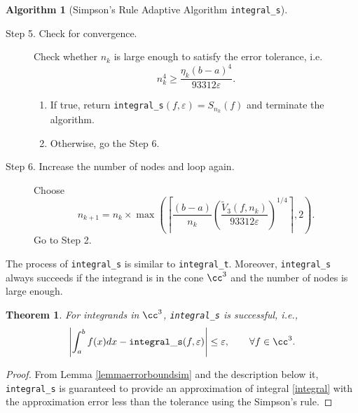 \documentclass{iitthesis}
\newtheorem{theorem}{Theorem}
\theoremstyle{definition}
\newtheorem{algo}{Algorithm}
\theoremstyle{remark}
\begin{document}
\begin{algo} [Simpson's Rule Adaptive Algorithm {\tt integral\_s}]
\begin{description}
\item[Step 5. Check for convergence.] Check whether $n_k$ is large enough to satisfy the error tolerance, i.e.
    \begin{equation*}
          n_k^4 \ge \frac{\eta_{k}(b-a)^4}{93312\varepsilon}.
    \end{equation*}

    \begin{enumerate}[label=\alph*)]
      \item If true, return {\tt integral\_s}$(f,\varepsilon)=S_{n_k}(f)$ and terminate the algorithm.
      \item Otherwise, go the Step 6.
    \end{enumerate}


\item[Step 6. Increase the number of nodes and loop again.] Choose
$$
n_{k+1}=n_k\times\max\left(\left\lceil\frac{(b-a)}{n_{k}}\left(\frac{\widetilde{V}_3(f,n_k)}{93312\varepsilon}\right)^{1/4}\right\rceil,2\right).
$$
Go to Step 2.
\end{description}
\end{algo}

The process of {\tt integral\_s} is similar to {\tt integral\_t}. Moreover, {\tt integral\_s} always succeeds if the integrand is in the cone $\cc^3$ and the number of nodes is large enough.
\begin{theorem}\label{thmSimpson}
    For integrands in $\cc^3$, {\tt integral\_s} is successful, i.e.,
    \begin{equation*}
      \left|\int_{a}^{b}f(x)dx-{\tt integral\_s}(f,\varepsilon)\right|\le\varepsilon, \qquad \forall f\in \cc^3.
    \end{equation*}
\end{theorem}
\begin{proof}
 From Lemma \ref{lemmaerrorboundsim} and the description below it, {\tt integral\_s} is guaranteed to provide an approximation of integral \eqref{integral} with the approximation error less than the tolerance using the Simpson's rule.
\end{proof}
\end{document}
